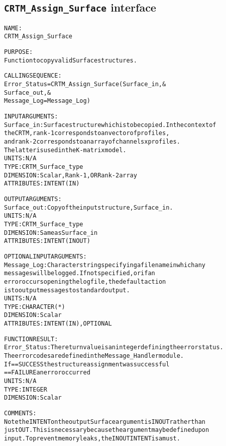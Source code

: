 \subsection{\texttt{CRTM\_Assign\_Surface} interface}
  \label{sec:CRTM_Assign_Surface_interface}
  \begin{alltt}
 
  NAME:
        CRTM_Assign_Surface
 
  PURPOSE:
        Function to copy valid Surface structures.
 
  CALLING SEQUENCE:
        Error_Status = CRTM_Assign_Surface( Surface_in             , &
                                            Surface_out            , &
                                            Message_Log=Message_Log  )
 
  INPUT ARGUMENTS:
        Surface_in:   Surface structure which is to be copied. In the context of
                      the CRTM, rank-1 corresponds to an vector of profiles,
                      and rank-2 corresponds to an array of channels x profiles.
                      The latter is used in the K-matrix model.
                      UNITS:      N/A
                      TYPE:       CRTM_Surface_type
                      DIMENSION:  Scalar, Rank-1, OR Rank-2 array
                      ATTRIBUTES: INTENT(IN)
 
  OUTPUT ARGUMENTS:
        Surface_out:  Copy of the input structure, Surface_in.
                      UNITS:      N/A
                      TYPE:       CRTM_Surface_type
                      DIMENSION:  Same as Surface_in
                      ATTRIBUTES: INTENT(IN OUT)
 
  OPTIONAL INPUT ARGUMENTS:
        Message_Log:  Character string specifying a filename in which any
                      messages will be logged. If not specified, or if an
                      error occurs opening the log file, the default action
                      is to output messages to standard output.
                      UNITS:      N/A
                      TYPE:       CHARACTER(*)
                      DIMENSION:  Scalar
                      ATTRIBUTES: INTENT(IN), OPTIONAL
 
  FUNCTION RESULT:
        Error_Status: The return value is an integer defining the error status.
                      The error codes are defined in the Message_Handler module.
                      If == SUCCESS the structure assignment was successful
                         == FAILURE an error occurred
                      UNITS:      N/A
                      TYPE:       INTEGER
                      DIMENSION:  Scalar
 
  COMMENTS:
        Note the INTENT on the output Surface argument is IN OUT rather than
        just OUT. This is necessary because the argument may be defined upon
        input. To prevent memory leaks, the IN OUT INTENT is a must.
 
  \end{alltt}
